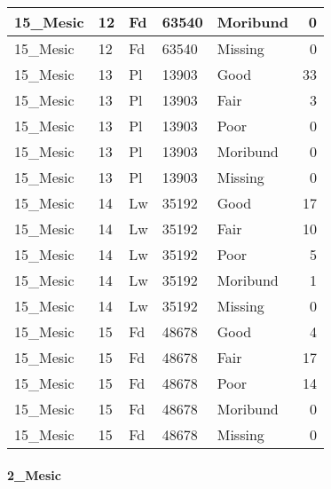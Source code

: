 \documentclass[
]{article}
\begin{document}
\begin{tabular}{l|l|l|l|l|r}
\hline
15\_Mesic & 12 & Fd & 63540 & Moribund & 0\\
\hline
15\_Mesic & 12 & Fd & 63540 & Missing & 0\\
\hline
15\_Mesic & 13 & Pl & 13903 & Good & 33\\
\hline
15\_Mesic & 13 & Pl & 13903 & Fair & 3\\
\hline
15\_Mesic & 13 & Pl & 13903 & Poor & 0\\
\hline
15\_Mesic & 13 & Pl & 13903 & Moribund & 0\\
\hline
15\_Mesic & 13 & Pl & 13903 & Missing & 0\\
\hline
15\_Mesic & 14 & Lw & 35192 & Good & 17\\
\hline
15\_Mesic & 14 & Lw & 35192 & Fair & 10\\
\hline
15\_Mesic & 14 & Lw & 35192 & Poor & 5\\
\hline
15\_Mesic & 14 & Lw & 35192 & Moribund & 1\\
\hline
15\_Mesic & 14 & Lw & 35192 & Missing & 0\\
\hline
15\_Mesic & 15 & Fd & 48678 & Good & 4\\
\hline
15\_Mesic & 15 & Fd & 48678 & Fair & 17\\
\hline
15\_Mesic & 15 & Fd & 48678 & Poor & 14\\
\hline
15\_Mesic & 15 & Fd & 48678 & Moribund & 0\\
\hline
15\_Mesic & 15 & Fd & 48678 & Missing & 0\\
\hline
\end{tabular}

\hypertarget{mesic-8}{%
\paragraph{2\_Mesic}\label{mesic-8}}
\end{document}
